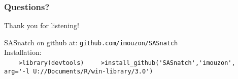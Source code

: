 \documentclass[xcolor=dvipsnames,gray,mathserif]{beamer}
\begin{document}
\begin{frame}[fragile]
   \frametitle{Questions?}

   \centerline{\LARGE{Thank you for listening!}} \vspace{2cm}

   SASnatch on github at: \verb!github.com/imouzon/SASnatch! \vspace{.4cm} \\

   Installation: \\
   \verb!    >library(devtools)!
   \verb!    >install_github('SASnatch','imouzon',!
   \verb!                    arg='-l U://Documents/R/win-library/3.0')!

\end{frame}
\end{document}
